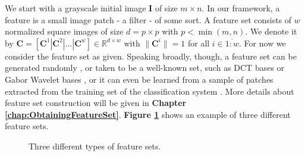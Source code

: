 \documentclass[12pt,a4paper,oneside,english]{UPBThesis}
\newcommand{\hctimes}[2]{{#1}\!\times\!{#2}}
\newcommand{\hcrange}[2]{\overline{{#1}\colon\!\!{#2}}}
\begin{document}
We start with a grayscale initial image $\textbf{I}$ of size $\hctimes{m}{n}$. In our framework, a feature is a small image patch - a filter - of some sort. A feature set consists of $w$ normalized square images of size $d = \hctimes{p}{p}$ with $p < \min(m,n)$. We denote it by $\textbf{C} = \left[ \textbf{C}^1 \left|\right. \textbf{C}^2 \left|\right. \dots \left|\right. \textbf{C}^w \right] \in \mathbb{R}^{\hctimes{d}{w}}$ with $\|\mathbf{C}^i\| = 1$ for all $i \in \hcrange{1}{w}$. For now we consider the feature set as given. Speaking broadly, though, a feature set can be generated randomly \cite{random-weights-feature-learning,beyond-simple-features}, or taken to be a well-known set, such as DCT bases or Gabor Wavelet bases \cite{simple-method-sparse-coding}, or it can even be learned from a sample of patches extracted from the training set of the classification system \cite{emergence-sparse-coding,sparse-coding-strategy-V1,tiny-images}. More details about feature set construction will be given in \textbf{Chapter \ref{chap:ObtainingFeatureSet}}. \textbf{Figure \ref{fig:OverviewExFeatures}} shows an example of three different feature sets.

\begin{figure}
\centering
{}
\caption{Three different types of feature sets.}
\label{fig:OverviewExFeatures}
\end{figure}
\end{document}

